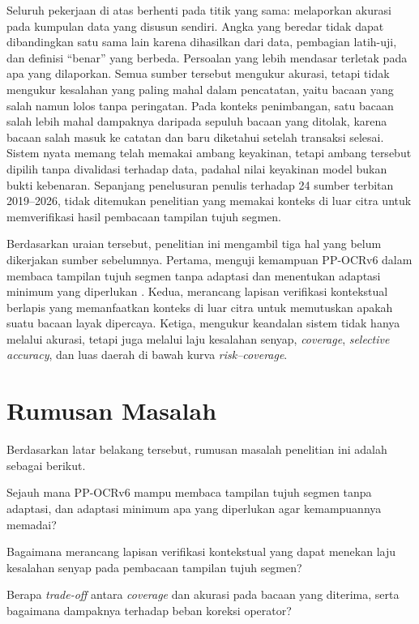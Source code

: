 Seluruh pekerjaan di atas berhenti pada titik yang sama: melaporkan akurasi pada
kumpulan data yang disusun sendiri. Angka yang beredar tidak dapat dibandingkan
satu sama lain karena dihasilkan dari data, pembagian latih-uji, dan definisi
``benar'' yang berbeda. Persoalan yang lebih mendasar terletak pada apa yang
dilaporkan. Semua sumber tersebut mengukur akurasi, tetapi tidak mengukur
kesalahan yang paling mahal dalam pencatatan, yaitu bacaan yang salah namun
lolos tanpa peringatan. Pada konteks penimbangan, satu bacaan salah lebih mahal
dampaknya daripada sepuluh bacaan yang ditolak, karena bacaan salah masuk ke
catatan dan baru diketahui setelah transaksi selesai. Sistem nyata memang telah
memakai ambang keyakinan, tetapi ambang tersebut dipilih tanpa divalidasi
terhadap data, padahal nilai keyakinan model bukan bukti kebenaran.
Sepanjang penelusuran penulis terhadap 24 sumber terbitan 2019--2026, tidak
ditemukan penelitian yang memakai konteks di luar citra untuk memverifikasi
hasil pembacaan tampilan tujuh segmen.

Berdasarkan uraian tersebut, penelitian ini mengambil tiga hal yang belum
dikerjakan sumber sebelumnya. Pertama, menguji kemampuan PP-OCRv6 dalam membaca
tampilan tujuh segmen tanpa adaptasi dan menentukan adaptasi minimum yang
diperlukan \parencite{zhang2026ppocrv6}. Kedua, merancang lapisan verifikasi
kontekstual berlapis yang memanfaatkan konteks di luar citra untuk memutuskan
apakah suatu bacaan layak dipercaya. Ketiga, mengukur keandalan sistem tidak
hanya melalui akurasi, tetapi juga melalui laju kesalahan senyap,
\textit{coverage}, \textit{selective accuracy}, dan luas daerah di bawah kurva
\textit{risk--coverage}.

\section{Rumusan Masalah}

Berdasarkan latar belakang tersebut, rumusan masalah penelitian ini adalah
sebagai berikut.
\begin{poin}
  \item Sejauh mana PP-OCRv6 mampu membaca tampilan tujuh segmen tanpa
        adaptasi, dan adaptasi minimum apa yang diperlukan agar kemampuannya
        memadai?
  \item Bagaimana merancang lapisan verifikasi kontekstual yang dapat menekan
        laju kesalahan senyap pada pembacaan tampilan tujuh segmen?
  \item Berapa \textit{trade-off} antara \textit{coverage} dan akurasi pada
        bacaan yang diterima, serta bagaimana dampaknya terhadap beban koreksi
        operator?
\end{poin}

